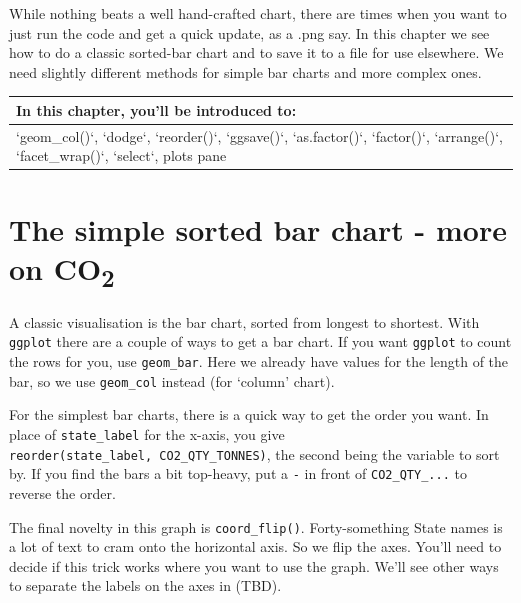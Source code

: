 \documentclass[
]{book}
\begin{document}
While nothing beats a well hand-crafted chart, there are times when you want to just run the code and get a quick update, as a .png say. In this chapter we see how to do a classic sorted-bar chart and to save it to a file for use elsewhere. We need slightly different methods for simple bar charts and more complex ones.

\begin{tabular}{l}
\hline
In this chapter, you'll be introduced to:\\
\hline
`geom\_col()`, `dodge`, `reorder()`, `ggsave()`, `as.factor()`, `factor()`, `arrange()`, `facet\_wrap()`, `select`, plots pane\\
\hline
\end{tabular}

\hypertarget{firstsortedbar}{%
\section{\texorpdfstring{The simple sorted bar chart - more on CO\textsubscript{2}}{The simple sorted bar chart - more on CO2}}\label{firstsortedbar}}

A classic visualisation is the bar chart, sorted from longest to shortest. With \texttt{ggplot} there are a couple of ways to get a bar chart. If you want \texttt{ggplot} to count the rows for you, use \texttt{geom\_bar}. Here we already have values for the length of the bar, so we use \texttt{geom\_col} instead (for `column' chart).

For the simplest bar charts, there is a quick way to get the order you want. In place of \texttt{state\_label} for the x-axis, you give \texttt{reorder(state\_label,\ CO2\_QTY\_TONNES)}, the second being the variable to sort by. If you find the bars a bit top-heavy, put a \texttt{-} in front of \texttt{CO2\_QTY\_...} to reverse the order.

The final novelty in this graph is \texttt{coord\_flip()}. Forty-something State names is a lot of text to cram onto the horizontal axis. So we flip the axes. You'll need to decide if this trick works where you want to use the graph. We'll see other ways to separate the labels on the axes in (TBD).
\end{document}
